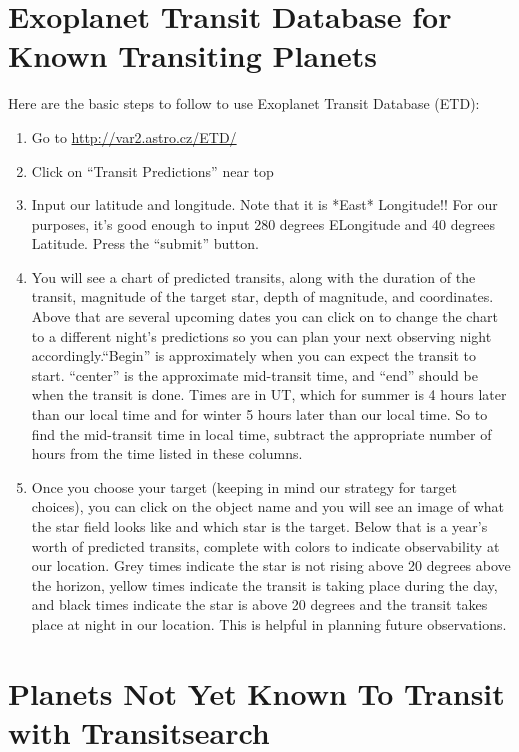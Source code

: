 \documentclass[12pt, preprint]{aastex}
\begin{document}
\section{Exoplanet Transit Database for Known Transiting Planets}

Here are the basic steps to follow to use Exoplanet Transit Database (ETD):

\begin{enumerate}
\item Go to \url{http://var2.astro.cz/ETD/}

\item Click on ``Transit Predictions''  near top

\item Input our latitude and longitude.  Note that it is *East* Longitude!!  For our purposes, it's good enough to input 280 degrees ELongitude and 40 degrees Latitude.  Press the ``submit'' button.

\item You will see a chart of predicted transits, along with  the duration of the transit, magnitude of the target star, depth of magnitude, and coordinates.  Above that are several upcoming dates you can click on to change the chart to a different night's predictions so you can plan your next observing night accordingly.``Begin'' is approximately when you can expect the transit to start.  ``center'' is the approximate mid-transit time, and ``end'' should be when the transit is done. Times are in UT, which for summer is 4 hours later than our local time and for winter 5 hours later than our local time.  So to find the mid-transit time in local time, subtract the appropriate number of hours from the time listed in these columns.

\item Once you choose your target (keeping in mind our strategy for target choices), you can click on the object name and you will see an image of what the star field looks like and which star is the target.  Below that is a year's worth of predicted transits, complete with colors to indicate observability at our location.  Grey times indicate the star is not rising above 20 degrees above the horizon, yellow times indicate the transit is taking place during the day, and black times indicate the  star is above 20 degrees and the transit takes place at night in our location.  This is helpful in planning future observations.
\end{enumerate}

\section{Planets Not Yet Known To Transit with Transitsearch}
\end{document}
